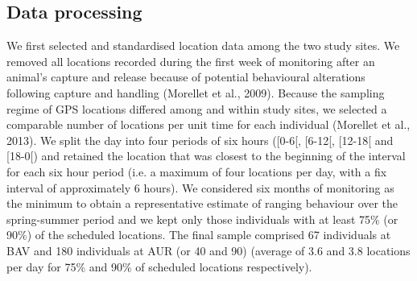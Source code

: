 \documentclass[a4paper,11pt]{article}
\begin{document}
\subsection{Data processing}
We first selected and standardised location data among the two study sites. We removed all locations recorded during the first week of monitoring after an animal’s capture and release because of potential behavioural alterations following capture and handling (Morellet et al., 2009). Because the sampling regime of GPS locations differed among and within study sites, we selected a comparable number of locations per unit time for each individual (Morellet et al., 2013). We split the day into four periods of six hours ([0-6[, [6-12[, [12-18[ and [18-0[) and retained the location that was closest to the beginning of the interval for each six hour period (i.e. a maximum of four locations per day, with a fix interval of approximately 6 hours). We considered six months of monitoring as the minimum to obtain a representative estimate of ranging behaviour over the spring-summer period and we kept only those individuals with at least 75\% (or 90\%) of the scheduled locations. The final sample comprised 67 individuals at BAV and 180 individuals at AUR (or 40 and 90) (average of 3.6 and 3.8 locations per day for 75\% and 90\% of scheduled locations respectively). 
\end{document}
